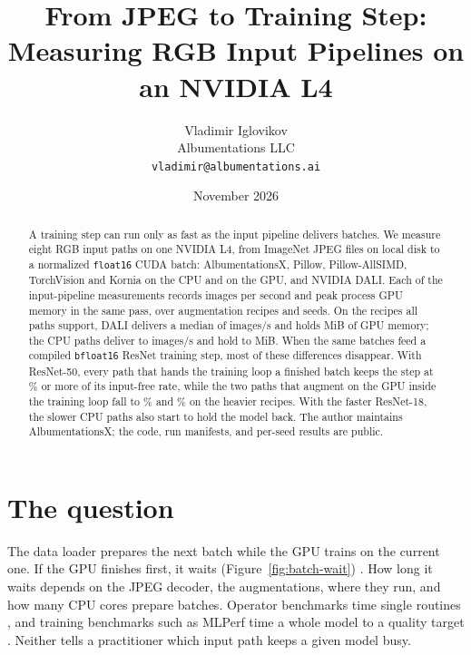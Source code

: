 \documentclass[11pt]{article}
\title{From JPEG to Training Step:\\Measuring RGB Input Pipelines on an NVIDIA L4}
\author{Vladimir Iglovikov\\Albumentations LLC\\\texttt{vladimir@albumentations.ai}}
\date{November 2026}
\begin{document}
\maketitle

\begin{abstract}
A training step can run only as fast as the input pipeline delivers batches. We measure eight
RGB input paths on one NVIDIA L4, from ImageNet JPEG files on local disk to a normalized
\texttt{float16} CUDA batch: AlbumentationsX, Pillow, Pillow-AllSIMD, TorchVision and Kornia on
the CPU and on the GPU, and NVIDIA DALI. Each of the \ProductionCellCount{} input-pipeline measurements records
images per second and peak process GPU memory in the same pass, over \RecipeCount{} augmentation
recipes and \SeedCount{} seeds. On the \CommonRecipeCount{} recipes all paths support, DALI
delivers a median of \CommonSpeedDALIGPU{} images/s and holds \CommonMemoryDALIGPU{} MiB of GPU
memory; the CPU paths deliver \CommonSpeedKorniaCPU{} to \CommonSpeedAlbumentationsX{} images/s
and hold \CommonMemoryAlbumentationsX{} to \CommonMemoryKorniaCPU{} MiB. When the same batches
feed a compiled \texttt{bfloat16} ResNet training step, most of these differences disappear. With
ResNet-50, every path that hands the training loop a finished batch keeps the step at
\TrainReadyFloorResNetFifty\% or more of its input-free rate, while the two paths that augment on
the GPU inside the training loop fall to \TrainMinResNetFiftyKorniaGPU\% and \TrainMinResNetFiftyTorchVisionGPU\%
on the heavier recipes. With the faster ResNet-18, the slower CPU paths also start to hold the
model back. The author maintains AlbumentationsX; the code, run manifests, and per-seed results
are public.
\end{abstract}

\section{The question}

The data loader prepares the next batch while the GPU trains on the current one. If the GPU
finishes first, it waits (Figure~\ref{fig:batch-wait}) \cite{datastalls}. How long it waits
depends on the JPEG decoder, the augmentations, where they run, and how many CPU cores prepare
batches. Operator benchmarks time single routines \cite{pytorchbenchmark}, and training
benchmarks such as MLPerf time a whole model to a quality target \cite{mlperf}. Neither tells a
practitioner which input path keeps a given model busy.
\end{document}
